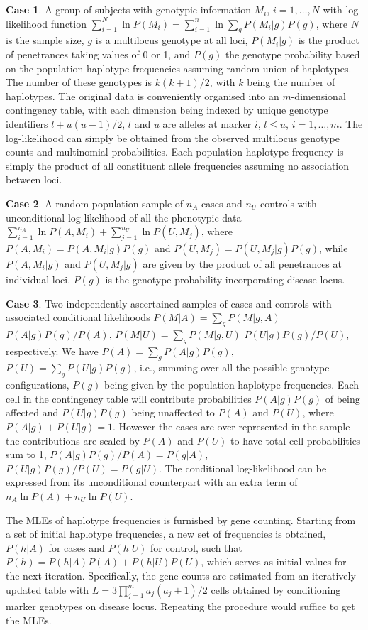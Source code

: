 {\bf Case 1}.  A group of subjects with genotypic information $M_i$,
$i=1,\ldots,N$ with log-likelihood function $\sum_{i=1}^N \ln
P(M_i)=\sum_{i=1}^n \ln\sum_g P(M_i|g) P(g)$, where $N$ is the sample size, $g$
is a multilocus genotype at all loci, $P(M_i|g)$ is the product of penetrances
taking values of 0 or 1, and $P(g)$ the genotype probability based on the
population haplotype frequencies assuming random union of haplotypes.  The
number of these genotypes is $k(k+1)/2$, with $k$ being the number of
haplotypes.  The original data is conveniently organised into an
$m$-dimensional contingency table, with each dimension being indexed by unique
genotype identifiers $l+u(u-1)/2$, $l$ and $u$ are alleles at marker $i$,
$l\leq u$, $i=1,\ldots, m$.  The log-likelihood can simply be obtained from the
observed multilocus genotype counts and multinomial probabilities.  Each
population haplotype frequency is simply the product of all constituent allele
frequencies assuming no association between loci.

{\bf Case 2}.  A random population sample of $n_A$ cases and $n_U$ controls
with unconditional log-likelihood of all the phenotypic data
$\sum_{i=1}^{n_A} \ln P(A,M_i) + \sum_{j=1}^{n_U} \ln
P(U,M_j)$, where $P(A,M_i)=P(A,M_i|g) P(g)$ and $P(U,M_j)=P(U,M_j|g)P(g)$,
while $P(A,M_i|g)$ and $P(U,M_j|g)$ are given by the product of all penetrances
at individual loci.  $P(g)$ is the genotype probability incorporating disease
locus.

{\bf Case 3}.  Two independently ascertained samples of cases and controls with
associated conditional likelihoods $P(M|A)=\sum_g P(M|g,A)$ $P(A|g)P(g)/P(A)$,
$P(M|U)=\sum_g P(M|g,U)$ $P(U|g)P(g)/P(U)$, respectively.  We have
$P(A)=\sum_gP(A|g)P(g)$, $P(U)=\sum_gP(U|g)P(g) $, i.e., summing over all the
possible genotype configurations, $P(g)$ being given by the population
haplotype frequencies.  Each cell in the contingency table will contribute
probabilities $P(A|g)P(g)$ of being affected and $P(U|g)P(g)$ being unaffected
to $P(A)$ and $P(U)$, where $P(A|g)+P(U|g)=1$.  However the cases are
over-represented in the sample the contributions are scaled by $P(A)$ and
$P(U)$ to have total cell probabilities sum to 1, $P(A|g)P(g)/P(A)=P(g|A)$,
$P(U|g)P(g)/P(U)=P(g|U)$.  The conditional log-likelihood can be expressed from
its unconditional counterpart with an extra term of $n_A \ln P(A) + n_U \ln
P(U)$.

The MLEs of haplotype frequencies is furnished by gene counting.  Starting from
a set of initial haplotype frequencies, a new set of frequencies is obtained,
$P(h|A)$ for cases and $P(h|U)$ for control, such that
$P(h)=P(h|A)P(A)+P(h|U)P(U)$, which serves as initial values for the next
iteration.  Specifically, the gene counts are estimated from an iteratively
updated table with $L=3\prod_{j=1}^m a_j(a_j+1)/2$ cells obtained by
conditioning marker genotypes on disease locus.  Repeating the procedure would
suffice to get the MLEs.

